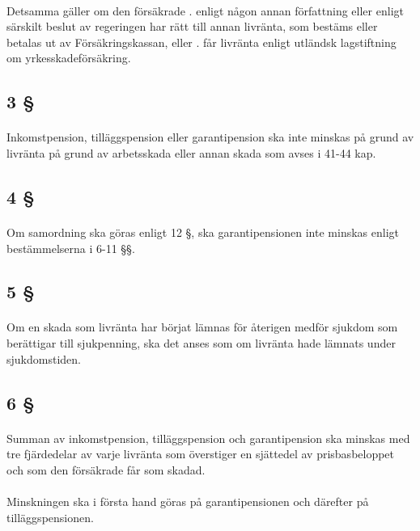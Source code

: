 \documentclass[a4paper,notitlepage,openany,10pt]{book}
\begin{document}
\paragraph*{}
Detsamma gäller om den försäkrade
. enligt någon annan författning eller enligt särskilt beslut av regeringen har rätt till annan livränta, som bestäms eller betalas ut av Försäkringskassan, eller
. får livränta enligt utländsk lagstiftning om yrkesskadeförsäkring.
\subsection*{3 §}
\paragraph*{}
Inkomstpension, tilläggspension eller garantipension ska inte minskas på grund av livränta på grund av arbetsskada eller annan skada som avses i 41-44 kap.
\subsection*{4 §}
\paragraph*{}
Om samordning ska göras enligt 12 §, ska garantipensionen inte minskas enligt bestämmelserna i 6-11 §§.
\subsection*{5 §}
\paragraph*{}
Om en skada som livränta har börjat lämnas för återigen medför sjukdom som berättigar till sjukpenning, ska det anses som om livränta hade lämnats under sjukdomstiden.
\subsection*{6 §}
\paragraph*{}
Summan av inkomstpension, tilläggspension och garantipension ska minskas med tre fjärdedelar av varje livränta som överstiger en sjättedel av prisbasbeloppet och som den försäkrade får som skadad.
\paragraph*{}
Minskningen ska i första hand göras på garantipensionen och därefter på tilläggspensionen.
\end{document}
